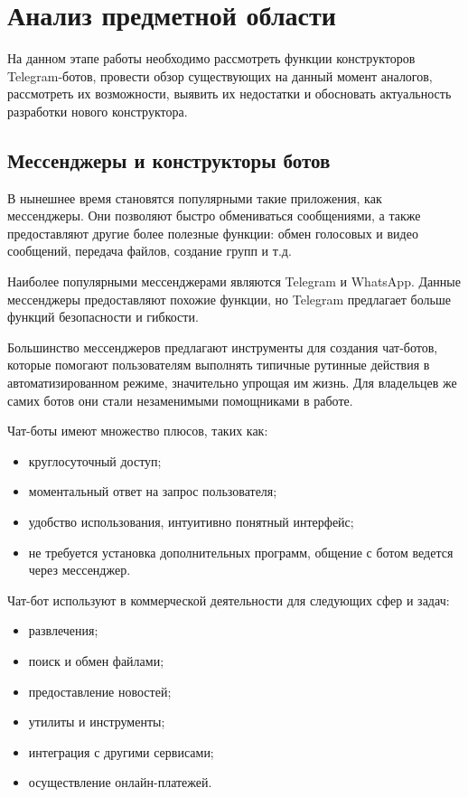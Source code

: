 
\section{Анализ предметной области}


На данном этапе работы необходимо рассмотреть функции
конструкторов Telegram-ботов,
провести обзор существующих на данный момент аналогов, рассмотреть их возможности,
выявить их
недостатки и обосновать актуальность разработки нового конструктора.

\subsection{Мессенджеры и конструкторы ботов}


В нынешнее время становятся популярными такие приложения, как мессенджеры.
Они позволяют быстро обмениваться сообщениями, а также предоставляют
другие более полезные функции:
обмен голосовых и видео сообщений, передача файлов, создание
групп и т.д.

Наиболее популярными мессенджерами являются Telegram и WhatsApp.
Данные мессенджеры предоставляют похожие функции, но Telegram предлагает больше
функций безопасности и гибкости.

Большинство мессенджеров предлагают инструменты для создания чат-ботов, которые помогают пользователям выполнять типичные рутинные действия в автоматизированном режиме,
значительно упрощая им жизнь. Для владельцев же самих ботов они стали
незаменимыми помощниками в работе.

Чат-боты имеют множество плюсов, таких как:
\begin{itemize}
	\item круглосуточный доступ;
	\item моментальный ответ на запрос пользователя;
	\item удобство использования, интуитивно понятный интерфейс;
	\item не требуется установка дополнительных программ,
	      общение с ботом ведется через мессенджер.
\end{itemize}

Чат-бот используют в коммерческой деятельности для следующих сфер и задач:
\begin{itemize}
	\item развлечения;
	\item поиск и обмен файлами;
	\item предоставление новостей;
	\item утилиты и инструменты;
	\item интеграция с другими сервисами;
	\item осуществление онлайн-платежей.
\end{itemize}


